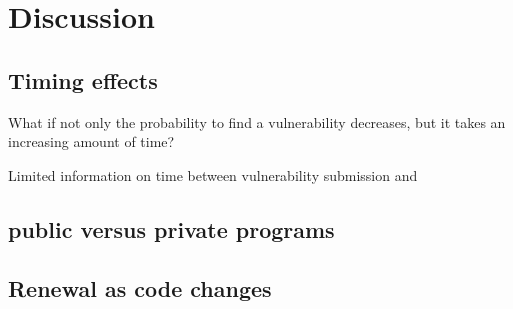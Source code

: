 \section{Discussion}
\label{sec:discussion}


\subsection{Timing effects}

What if not only the probability to find a vulnerability decreases, but it takes an increasing amount of time? 



Limited information on time between vulnerability submission and 


\subsection{public versus private programs}


\subsection{Renewal as code changes}